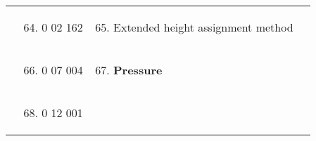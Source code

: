 \begin{longtable}[]{@{}llll@{}}
\begin{minipage}[t]{0.22\columnwidth}
\end{minipage} & \begin{minipage}[t]{0.22\columnwidth}\raggedright
\begin{enumerate}
\setcounter{enumi}{63}
\item
  0 02 162
\end{enumerate}\strut
\end{minipage} & \begin{minipage}[t]{0.22\columnwidth}\raggedright
\begin{enumerate}
\setcounter{enumi}{64}
\item
  Extended height assignment method
\end{enumerate}\strut
\end{minipage} & \begin{minipage}[t]{0.22\columnwidth}\raggedright
\strut
\end{minipage}\tabularnewline
\begin{minipage}[t]{0.22\columnwidth}\raggedright
\strut
\end{minipage} & \begin{minipage}[t]{0.22\columnwidth}\raggedright
\begin{enumerate}
\setcounter{enumi}{65}
\item
  0 07 004
\end{enumerate}\strut
\end{minipage} & \begin{minipage}[t]{0.22\columnwidth}\raggedright
\begin{enumerate}
\setcounter{enumi}{66}
\item
  \textbf{Pressure}
\end{enumerate}\strut
\end{minipage} & \begin{minipage}[t]{0.22\columnwidth}\raggedright
\strut
\end{minipage}\tabularnewline
\begin{minipage}[t]{0.22\columnwidth}\raggedright
\strut
\end{minipage} & \begin{minipage}[t]{0.22\columnwidth}\raggedright
\begin{enumerate}
\setcounter{enumi}{67}
\item
  0 12 001
\end{enumerate}\strut
\end{minipage} & \begin{minipage}[t]{0.22\columnwidth}\raggedright
\begin{enumerate}

\end{enumerate}
\end{minipage}
\end{longtable}
